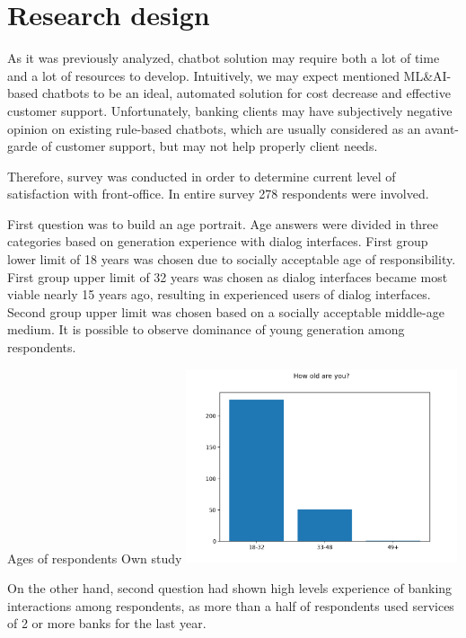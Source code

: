 
\section{Research design}

As it was previously analyzed, chatbot solution may require both a lot of time and a lot of resources to develop.
Intuitively, we may expect mentioned ML\&AI-based chatbots to be an ideal, automated solution for cost decrease and effective customer support.
Unfortunately, banking clients may have subjectively negative opinion on existing rule-based chatbots, which are usually considered as an avant-garde of customer support, but may not help properly client needs.

Therefore, survey was conducted in order to determine current level of satisfaction with front-office.
In entire survey 278 respondents were involved.

First question was to build an age portrait. 
Age answers were divided in three categories based on generation experience with dialog interfaces.
First group lower limit of 18 years was chosen due to socially acceptable age of responsibility.
First group upper limit of 32 years was chosen as dialog interfaces became most viable nearly 15 years ago, resulting in experienced users of dialog interfaces.
Second group upper limit was chosen based on a socially acceptable middle-age medium. 
It is possible to observe dominance of young generation among respondents.

\mtfigure
{Ages of respondents}
{Own study}
{
    \includegraphics[width=0.6\textwidth,height=\textheight,keepaspectratio]{survey/1_how_old_are_you?.png}
}

On the other hand, second question had shown high levels experience of banking interactions among respondents, as more than a half of respondents used services of 2 or more banks for the last year.

